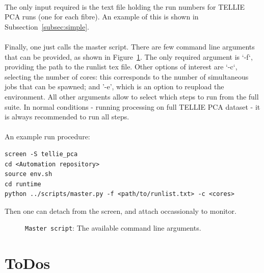\documentclass[12pt]{article}
\begin{document}
\paragraph{}
The only input required is the text file holding the run numbers for TELLIE PCA runs (one for each fibre). An example of this is shown in Subsection~\ref{subsec:simple}.

\paragraph{}
Finally, one just calls the master script. There are few command line arguments that can be provided, as shown in Figure~\ref{fig:args}. The only required argument is `-f`, providing the path to the runlist tex file. Other options of interest are `-c`, selecting the number of cores: this corresponds to the number of simultaneous jobs that can be spawned; and '-e', which is an option to reupload the environment. All other arguments allow to select which steps to run from the full suite. In normal conditions - running processing on full TELLIE PCA dataset - it is always recommended to run all steps.

\paragraph{}
An example run procedure:
\begin{lstlisting}
screen -S tellie_pca
cd <Automation repository>
source env.sh
cd runtime
python ../scripts/master.py -f <path/to/runlist.txt> -c <cores>
\end{lstlisting}
Then one can detach from the screen, and attach occassionaly to monitor.

\begin{figure}
\centering
\noindent{}
  \caption{\centering \texttt{Master script}: The available command line arguments.}
  \label{fig:args}
\end{figure}

\clearpage

\section{ToDos}
\end{document}
